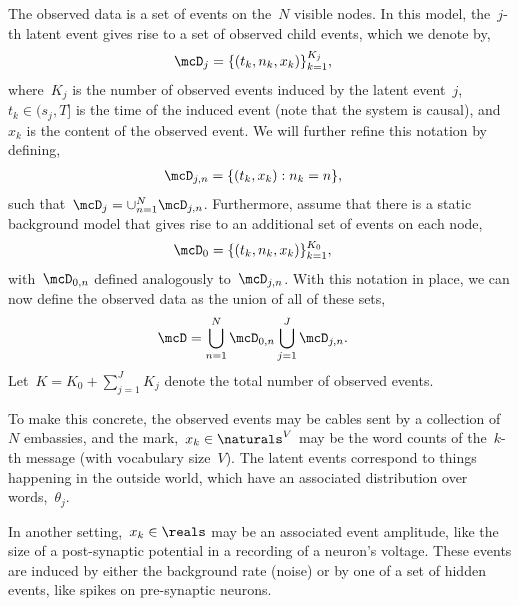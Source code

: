 The observed data is a set of events on the~$N$ visible nodes.
In this model, the~$j$-th latent event gives rise to a set of observed child
events, which we denote by,
\begin{align}
  \mcD_j &= \{(t_k, n_k, x_k)\}_{k=1}^{K_j},
\end{align}
where~$K_j$ is the number of observed events induced by the latent
event~$j$,~$t_k \in (s_j,T]$ is the time of the induced event (note
that the system is causal), and~$x_k$ is the content of the observed
event. We will further refine this notation by defining,
\begin{align}
  \mcD_{j,n} &= \{(t_k, x_k): n_k = n\},
\end{align}
such that~$\mcD_j = \cup_{n=1}^N \mcD_{j,n}$.
Furthermore, assume that there is a static background model
that gives rise to an additional set of events on each node,
\begin{align}
 \mcD_0 &= \{(t_k, n_k, x_k)\}_{k=1}^{K_0},
\end{align}
with~$\mcD_{0,n}$ defined analogously to~$\mcD_{j,n}$. With this
notation in place, we can now define the observed data as
the union of all of these sets,
\begin{align}
  \mcD &= \bigcup_{n=1}^N \mcD_{0,n} \bigcup_{j=1}^J \mcD_{j,n}.
\end{align}
Let~$K=K_0 + \sum_{j=1}^J K_j$ denote the total number of observed events.

To make this concrete, the observed events may be cables sent by a
collection of~$N$ embassies, and the mark,~$x_k \in \naturals^V$ may
be the word counts of the~$k$-th message (with vocabulary
size~$V$). The latent events correspond to things happening in the
outside world, which have an associated distribution over
words,~$\theta_j$.

In another setting,~$x_k \in \reals$ may be an associated event
amplitude, like the size of a post-synaptic potential in a recording
of a neuron's voltage. These events are induced by either the
background rate (noise) or by one of a set of hidden events, like
spikes on pre-synaptic neurons.

